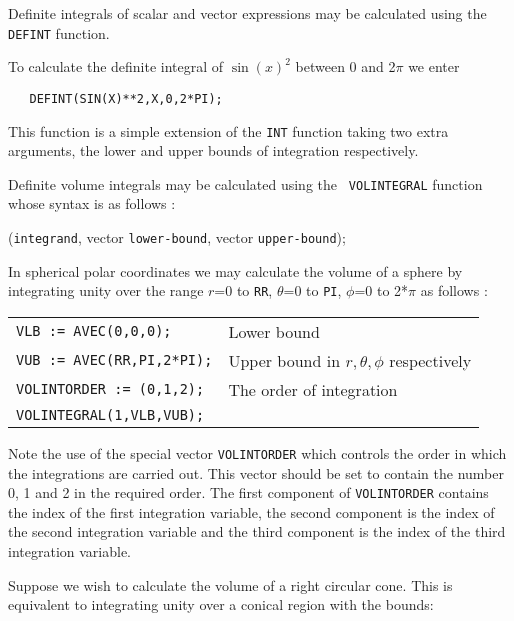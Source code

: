 Definite integrals of scalar and vector expressions may be calculated
using the {\tt DEFINT} function.

\example{}

 
\noindent To calculate the definite integral of $\sin(x)^2$ between 0 and
2$\pi$ we enter
\begin{verbatim}
   DEFINT(SIN(X)**2,X,0,2*PI);
\end{verbatim}
This function is a simple extension of the {\tt INT} function taking
two extra arguments, the lower and upper bounds of integration
respectively.

 
Definite volume integrals may be calculated using the {\tt
VOLINTEGRAL} function whose syntax is as follows :

({\tt integrand}, vector {\tt lower-bound},
vector {\tt upper-bound});

\example{}

\noindent In spherical polar coordinates we may calculate the volume of a
sphere by integrating unity over the range $r$=0 to {\tt RR}, $\theta$=0 to
{\tt PI}, $\phi$=0 to 2*$\pi$ as follows :

\begin{tabular}{l l}
{\tt VLB := AVEC(0,0,0);} & Lower bound \\
{\tt VUB := AVEC(RR,PI,2*PI);} & Upper bound in $r, \theta, \phi$
 respectively \\
{\tt VOLINTORDER := (0,1,2);} & The order of integration \\
{\tt VOLINTEGRAL(1,VLB,VUB);} & \\
\end{tabular}

Note the use of the special vector {\tt VOLINTORDER} which controls
the order in which the integrations are carried out. This vector
should be set to contain the number 0, 1 and 2 in the required order.
The first component of {\tt VOLINTORDER} contains the index of the
first integration variable, the second component is the index of the
second integration variable and the third component is the index of
the third integration variable.

\example{}

Suppose we wish to calculate the volume of a right circular cone. This
is equivalent to integrating unity over a conical region with the
bounds:

